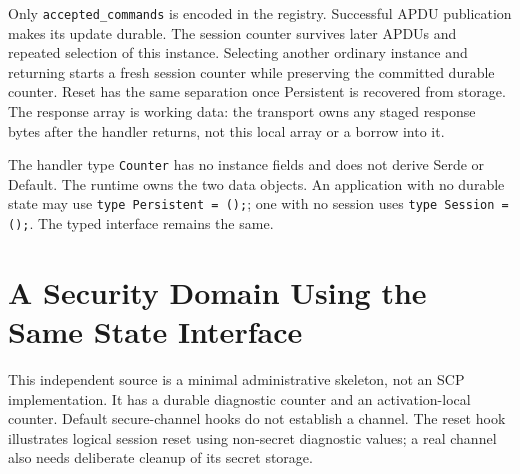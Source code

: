 Only \texttt{accepted\_commands} is encoded in the registry. Successful APDU
publication makes its update durable. The session counter survives later
APDUs and repeated selection of this instance. Selecting another ordinary
instance and returning starts a fresh session counter while preserving the
committed durable counter. Reset has the same separation once Persistent is
recovered from storage. The response array is working data: the transport
owns any staged response bytes after the handler returns, not this local
array or a borrow into it.

The handler type \texttt{Counter} has no instance fields and does not derive
Serde or Default. The runtime owns the two data objects. An application with
no durable state may use \texttt{type Persistent = ();}; one with no session
uses \texttt{type Session = ();}. The typed interface remains the same.

\section{A Security Domain Using the Same State Interface}

This independent source is a minimal administrative skeleton, not an SCP
implementation. It has a durable diagnostic counter and an activation-local
counter. Default secure-channel hooks do not establish a channel. The reset
hook illustrates logical session reset using non-secret diagnostic values;
a real channel also needs deliberate cleanup of its secret storage.

